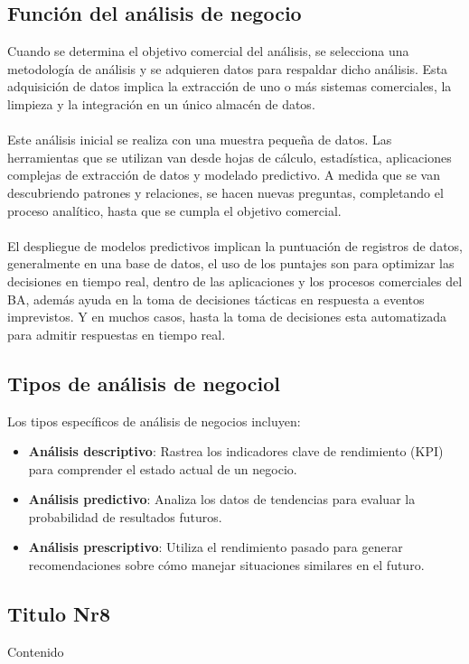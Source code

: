 \documentclass[twoside,twocolumn]{article}
\begin{document}
\subsection{Función del análisis de negocio}
Cuando se determina el objetivo comercial del análisis, se selecciona una metodología de análisis y se adquieren datos para respaldar dicho análisis.  Esta adquisición de datos implica la extracción de uno o más sistemas comerciales, la limpieza y la integración en un único almacén de datos.
\\ \\
Este análisis inicial se realiza con una muestra pequeña de datos.  Las herramientas que se utilizan van desde hojas de cálculo, estadística, aplicaciones complejas de extracción de datos y modelado predictivo. A medida que se van descubriendo patrones y relaciones, se hacen nuevas preguntas, completando el proceso analítico, hasta que se cumpla el objetivo comercial.
\\ \\
El despliegue de modelos predictivos implican la puntuación de registros de datos, generalmente en una base de datos, el uso de los puntajes son para optimizar las decisiones en tiempo real, dentro de las aplicaciones y los procesos comerciales del BA, además ayuda en la toma de decisiones tácticas en respuesta a eventos imprevistos.  Y en muchos casos, hasta la toma de decisiones esta automatizada para admitir respuestas en tiempo real.
\subsection{Tipos de análisis de negociol}
Los tipos específicos de análisis de negocios incluyen:

\begin{itemize}	

	\item \textbf{Análisis descriptivo}: Rastrea los indicadores clave de rendimiento (KPI) para comprender el estado actual de un negocio.
	\item \textbf{Análisis predictivo}: Analiza los datos de tendencias para evaluar la probabilidad de resultados futuros.
	\item \textbf{Análisis prescriptivo}: Utiliza el rendimiento pasado para generar recomendaciones sobre cómo manejar situaciones similares en el futuro.

\end{itemize} 



\subsection{Titulo Nr8}
Contenido 
\end{document}
